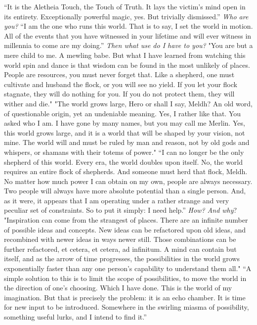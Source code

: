 \begin{flushright}
“It is the Aletheia Touch, the Touch of Truth. It lays the victim’s mind open in its entirety. Exceptionally powerful magic, yes. But trivially dismissed.”
\SmallVSpace
\emph{Who are you?}
\SmallVSpace
“I am the one who runs this world. That is to say, I set the world in motion. All of the events that you have witnessed in your lifetime and will ever witness in millennia to come are my doing.”
\SmallVSpace
\emph{Then what use do I have to you?}
\SmallVSpace
"You are but a mere child to me. A mewling babe. But what I have learned from watching this world spin and dance is that wisdom can be found in the most unlikely of places. People are resources, you must never forget that. Like a shepherd, one must cultivate and husband the flock, or you will see no yield. If you let your flock stagnate, they will do nothing for you. If you do not protect them, they will wither and die."
\SmallVSpace
"The world grows large, Hero{\el} or shall I say, Meldh? An old word, of questionable origin, yet an undeniable meaning. Yes, I rather like that. You asked who I am. I have gone by many names, but you may call me Merlin. Yes, this world grows large, and it is a world that will be shaped by your vision, not mine. The world will and must be ruled by man and reason, not by old gods and whispers, or shamans with their totems of power."
\SmallVSpace
“I can no longer be the only shepherd of this world. Every era, the world doubles upon itself. No, the world requires an entire flock of shepherds. And someone must herd that flock, Meldh. No matter how much power I can obtain on my own, people are always necessary. Two people will always have more absolute potential than a single person. And, as it were, it appears that I am operating under a rather strange and very peculiar set of constraints. So to put it simply: I need help.”
\SmallVSpace
\emph{How? And why}?
\SmallVSpace
"Inspiration can come from the strangest of places. There are an infinite number of possible ideas and concepts. New ideas can be refactored upon old ideas, and recombined with newer ideas in ways newer still. Those combinations can be further refactored, et cetera, et cetera, ad infinitum. A mind can contain but itself, and as the arrow of time progresses, the possibilities in the world grows exponentially faster than any one person’s capability to understand them all."
\SmallVSpace
“A simple solution to this is to limit the scope of possibilities, to move the world in the direction of one’s choosing. Which I have done. This is the world of my imagination. But that is precisely the problem: it is an echo chamber. It is time for new input to be introduced. Somewhere in the swirling miasma of possibility, something useful lurks, and I intend to find it.”

\end{flushright}
